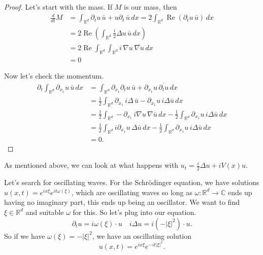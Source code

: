 \begin{proof}
	Let's start with the mass. If \( M \) is our mass, then
	\begin{align*}
		\frac{d}{dt} M &= \int_{\mathbb{R}^{d}} \partial_{t}u \, \bar u + u \partial_{t} \, \bar u \, dx = 2 \int_{\mathbb{R}^{d}}  \operatorname{Re}(\partial_{t} u \, \bar u) \, dx \\ 
									 &= 2 \operatorname{Re} \left(  \int_{\mathbb{R}^{d}} \frac{i}{2} \Delta u \, \bar u \, dx \right) \\
									 &= 2 \operatorname{Re} \int_{\mathbb{R}^{d}} \int_{\mathbb{R}^{d}}  i\,  \nabla u \,\overline{\nabla u} \, dx \\
									 &= 0  
	\end{align*}

	Now let's check the momentum.
	\begin{align*}
		\partial_{t} \int_{\mathbb{R}^{d}}  \partial_{x_{1}} u \, \bar u \, dx &= \int_{\mathbb{R}^{d}} \partial_{x_{1}} \partial_{t} u \, \bar u	+ \partial_{x_{1}} u \, \overline{\partial_{t} u} \, dx \\
		&= \frac{1}{2} \int_{\mathbb{R}^{d}} \partial_{x_{1}} \, i\Delta \, \bar u - \partial_{x_{1}} u \, i\Delta \bar u \, dx\\
		&= \frac{1}{2} \int_{\mathbb{R}^{d}} - \partial_{x_{1}} \, i \nabla u \, \nabla \bar u \, dx- \frac{1}{2}  \int_{\mathbb{R}^{d}} \partial_{x_{1}} u \, i\Delta \bar u\, dx \\
		&= \frac{1}{2} \int_{\mathbb{R}^{d}} i \partial_{x_{1}} u \, \Delta \bar u \, dx - \frac{1}{2}  \int_{\mathbb{R}^{d}} \partial_{x_{1}} u \, i \Delta \bar u \, dx \\
		&= 0.
	\end{align*}
\end{proof}
As mentioned above, we can look at what happens with \( u_{t} = \frac{i}{2} \Delta u + i V(x) u \).

Let's search for oscillating waves. For the Schr\"odinger equation, we have solutions \( u(x, t) = e^{i x \xi} e^{i t \omega(\xi)} \), which are oscillating waves so long as \( \omega \colon \mathbb{R}^{d} \to \mathbb{C} \) ends up having no imaginary part, this ends up being an oscillator. We want to find \( \xi \in \mathbb{R}^{d} \) and suitable \( \omega \) for this. So let's plug into our equation.
\[ \partial_{t} u = i \omega(\xi) \cdot u \quad i \Delta u = i \left( - | \xi|^{2} \right) \cdot u. \]
So if we have \( \omega( \xi) = - | \xi|^{2} \), we have an oscillating solution
\[ u(x, t) = e^{i x \xi} e^{-i t | \xi|^{2}}. \]

